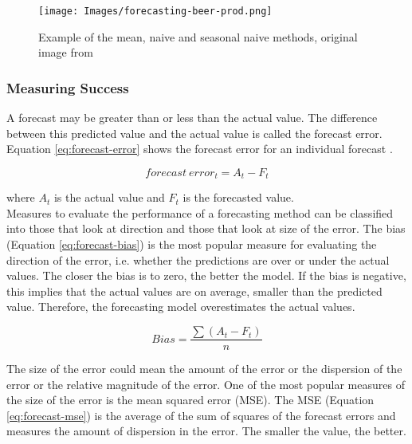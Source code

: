 \begin{figure}[H]
\begin{center}
    \texttt{[image: Images/forecasting-beer-prod.png]}
    \caption{Example of the mean, naive and seasonal naive methods, original image from \cite{forecasting-book}}
    \label{fig:forecasting}
\end{center}
\end{figure}

\subsubsection{Measuring Success}

A forecast may be greater than or less than the actual value. The difference between this predicted value and the actual value is called the forecast error. Equation \ref{eq:forecast-error} shows the forecast error for an individual forecast \cite{forecasting-performance-measures}.

\begin{equation}
\label{eq:forecast-error}
    forecast\ error_t = A_t - F_t
\end{equation}

\noindent where $A_t$ is the actual value and $F_t$ is the forecasted value. \\

Measures to evaluate the performance of a forecasting method can be classified into those that look at direction and those that look at size of the error. The bias (Equation \ref{eq:forecast-bias}) is the most popular measure for evaluating the direction of the error, i.e. whether the predictions are over or under the actual values. The closer the bias is to zero, the better the model. If the bias is negative, this implies that the actual values are on average, smaller than the predicted value. Therefore, the forecasting model overestimates the actual values.

\begin{equation}
\label{eq:forecast-bias}
    Bias = \frac{\sum(A_t-F_t)}{n}
\end{equation}

The size of the error could mean the amount of the error or the dispersion of the error or the relative magnitude of the error. One of the most popular measures of the size of the error is the mean squared error (MSE). The MSE (Equation \ref{eq:forecast-mse}) is the average of the sum of squares of the forecast errors and measures the amount of dispersion in the error. The smaller the value, the better.

